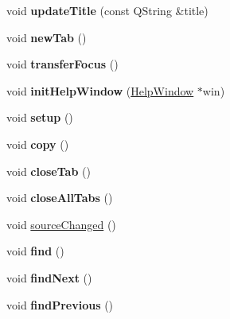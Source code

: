 \begin{DoxyCompactItemize}
\item 
\hypertarget{classTabbedBrowser_a000ce241e8d097d786cf8db903a80185}{
void {\bfseries updateTitle} (const QString \&title)}
\label{classTabbedBrowser_a000ce241e8d097d786cf8db903a80185}

\item 
\hypertarget{classTabbedBrowser_ab86c64b518757386951fc2aa24c37a58}{
void {\bfseries newTab} ()}
\label{classTabbedBrowser_ab86c64b518757386951fc2aa24c37a58}

\item 
\hypertarget{classTabbedBrowser_a39bac2c6558fc14bcdb66c1409af4b16}{
void {\bfseries transferFocus} ()}
\label{classTabbedBrowser_a39bac2c6558fc14bcdb66c1409af4b16}

\item 
\hypertarget{classTabbedBrowser_a314f9358333a03a2a9b90b4317868ec3}{
void {\bfseries initHelpWindow} (\hyperlink{classHelpWindow}{HelpWindow} $\ast$win)}
\label{classTabbedBrowser_a314f9358333a03a2a9b90b4317868ec3}

\item 
\hypertarget{classTabbedBrowser_a570ea8c8e2bb6e3548230f84dcf183cc}{
void {\bfseries setup} ()}
\label{classTabbedBrowser_a570ea8c8e2bb6e3548230f84dcf183cc}

\item 
\hypertarget{classTabbedBrowser_a9c664de1a435f17793d02957e10e27eb}{
void {\bfseries copy} ()}
\label{classTabbedBrowser_a9c664de1a435f17793d02957e10e27eb}

\item 
\hypertarget{classTabbedBrowser_a5bbbd8c8a8004b5328fcf9b9c4f5c6af}{
void {\bfseries closeTab} ()}
\label{classTabbedBrowser_a5bbbd8c8a8004b5328fcf9b9c4f5c6af}

\item 
\hypertarget{classTabbedBrowser_a47b7c555431b0fcaf4fd4e765d1dbbd8}{
void {\bfseries closeAllTabs} ()}
\label{classTabbedBrowser_a47b7c555431b0fcaf4fd4e765d1dbbd8}

\item 
void \hyperlink{classTabbedBrowser_a8412f63c3870e699ef80355a129b1047}{sourceChanged} ()
\item 
\hypertarget{classTabbedBrowser_a3cd4c9e73f61e358da0deb02fe0806b5}{
void {\bfseries find} ()}
\label{classTabbedBrowser_a3cd4c9e73f61e358da0deb02fe0806b5}

\item 
\hypertarget{classTabbedBrowser_a51d37dc4944c008ff33fe5eee974391e}{
void {\bfseries findNext} ()}
\label{classTabbedBrowser_a51d37dc4944c008ff33fe5eee974391e}

\item 
\hypertarget{classTabbedBrowser_ae0af926c4ac84d1fb3bd590777d35463}{
void {\bfseries findPrevious} ()}
\label{classTabbedBrowser_ae0af926c4ac84d1fb3bd590777d35463}

\end{DoxyCompactItemize}
